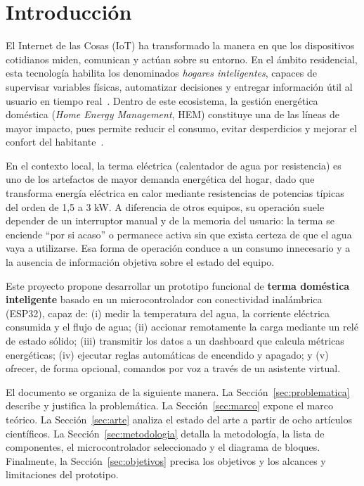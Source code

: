\documentclass[11pt,a4paper]{article}
\begin{document}
\section{Introducción}
El Internet de las Cosas (IoT) ha transformado la manera en que los dispositivos cotidianos miden, comunican y actúan sobre su entorno. En el ámbito residencial, esta tecnología habilita los denominados \emph{hogares inteligentes}, capaces de supervisar variables físicas, automatizar decisiones y entregar información útil al usuario en tiempo real~\cite{alfuqaha2015}. Dentro de este ecosistema, la gestión energética doméstica (\emph{Home Energy Management}, HEM) constituye una de las líneas de mayor impacto, pues permite reducir el consumo, evitar desperdicios y mejorar el confort del habitante~\cite{ford2017,zipperer2013}.

En el contexto local, la terma eléctrica (calentador de agua por resistencia) es uno de los artefactos de mayor demanda energética del hogar, dado que transforma energía eléctrica en calor mediante resistencias de potencias típicas del orden de 1{,}5 a 3 kW. A diferencia de otros equipos, su operación suele depender de un interruptor manual y de la memoria del usuario: la terma se enciende ``por si acaso'' o permanece activa sin que exista certeza de que el agua vaya a utilizarse. Esa forma de operación conduce a un consumo innecesario y a la ausencia de información objetiva sobre el estado del equipo.

Este proyecto propone desarrollar un prototipo funcional de \textbf{terma doméstica inteligente} basado en un microcontrolador con conectividad inalámbrica (ESP32), capaz de: (i) medir la temperatura del agua, la corriente eléctrica consumida y el flujo de agua; (ii) accionar remotamente la carga mediante un relé de estado sólido; (iii) transmitir los datos a un dashboard que calcula métricas energéticas; (iv) ejecutar reglas automáticas de encendido y apagado; y (v) ofrecer, de forma opcional, comandos por voz a través de un asistente virtual.

El documento se organiza de la siguiente manera. La Sección~\ref{sec:problematica} describe y justifica la problemática. La Sección~\ref{sec:marco} expone el marco teórico. La Sección~\ref{sec:arte} analiza el estado del arte a partir de ocho artículos científicos. La Sección~\ref{sec:metodologia} detalla la metodología, la lista de componentes, el microcontrolador seleccionado y el diagrama de bloques. Finalmente, la Sección~\ref{sec:objetivos} precisa los objetivos y los alcances y limitaciones del prototipo.
\end{document}
